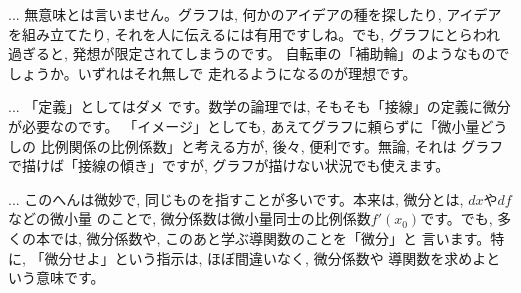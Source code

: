 \begin{faq}{\small{} ... 
無意味とは言いません。グラフは, 何かのアイデアの種を探したり, 
アイデアを組み立てたり, それを人に伝えるには有用ですしね。でも, 
グラフにとらわれ過ぎると, 発想が限定されてしまうのです。
自転車の「補助輪」のようなものでしょうか。いずれはそれ無しで
走れるようになるのが理想です。

 ... 「定義」としてはダメ
です。数学の論理では, そもそも「接線」の定義に微分が必要なのです。
「イメージ」としても, あえてグラフに頼らずに「微小量どうしの
比例関係の比例係数」と考える方が, 後々, 便利です。無論, それは
グラフで描けば「接線の傾き」ですが, グラフが描けない状況でも使えます。

 ... このへんは微妙で, 
同じものを指すことが多いです。本来は, 微分とは, $dx$や$df$などの微小量
のことで, 微分係数は微小量同士の比例係数$f'(x_0)$です。でも, 
多くの本では, 微分係数や, このあと学ぶ導関数のことを「微分」と
言います。特に, 「微分せよ」という指示は, ほぼ間違いなく, 微分係数や
導関数を求めよという意味です。}\end{faq}

